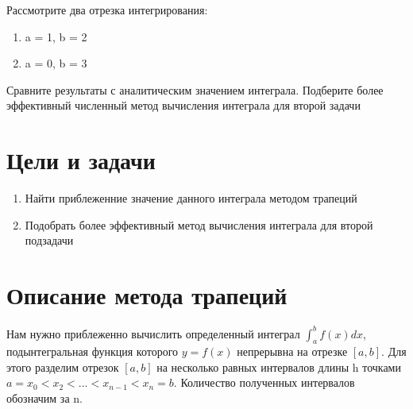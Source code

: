 \documentclass[a4paper,12pt]{report}
\begin{document}
	Рассмотрите два отрезка интегрирования:
	
	\begin{enumerate}
		\item a = 1, b = 2
		\item a = 0, b = 3
	\end{enumerate}
	
	Сравните результаты с аналитическим значением интеграла.
	Подберите более эффективный численный метод вычисления интеграла для второй задачи
	
	\section{Цели и задачи}
	
	\begin{enumerate}
		\item Найти приблеженние значение данного интеграла методом трапеций 
		\item Подобрать более эффективный метод вычисления интеграла для второй подзадачи
		
	\end{enumerate}
	
	\section{Описание метода трапеций}
	Нам нужно приблеженно вычислить определенный интеграл
	$\int_{a}^{b} f(x) dx$, подынтегральная функция которого $y = f(x)$ непрерывна на отрезке $[a, b]$. Для этого разделим отрезок $[a, b]$ на несколько равных интервалов длины h точками $a = x_0 < x_2 < ... < x_{n-1} < x_n = b$. Количество полученных интервалов обозначим за n.
	
	
\end{document}
